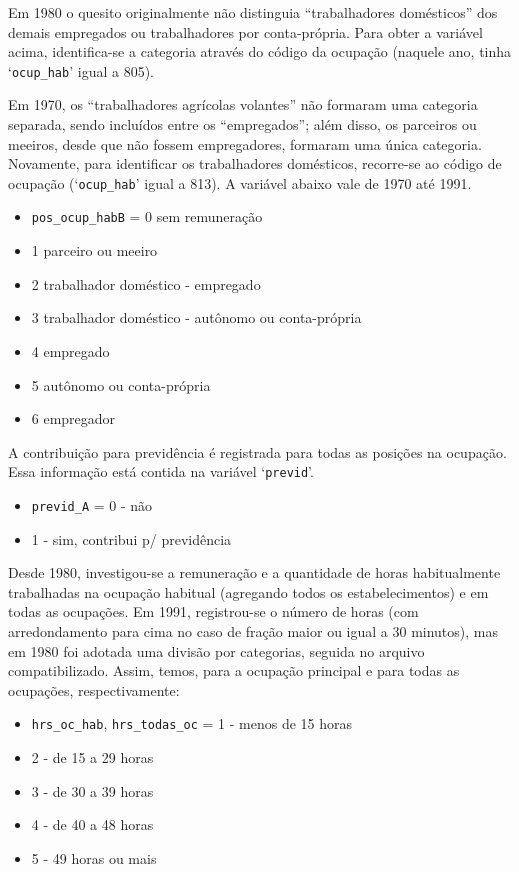 \documentclass[12pt,a4paper]{article}
\newcommand{\vr}[1]{\texttt{#1}}
\begin{document}
Em 1980 o quesito originalmente não distinguia “trabalhadores domésticos” dos demais empregados ou trabalhadores por conta-própria. Para obter a variável acima, identifica-se a categoria através do código da ocupação (naquele ano, tinha ‘\vr{ocup\_hab}’ igual a 805).

Em 1970, os “trabalhadores agrícolas volantes” não formaram uma categoria separada, sendo incluídos entre os “empregados”; além disso, os parceiros ou meeiros, desde que não fossem empregadores, formaram uma única categoria. Novamente, para identificar os trabalhadores domésticos, recorre-se ao código de ocupação (‘\vr{ocup\_hab}’ igual a 813). A variável abaixo vale de 1970 até 1991.
\begin{itemize}
  \item \vr{pos\_ocup\_habB} = 0 sem remuneração
  \item 1 parceiro ou meeiro
  \item 2 trabalhador doméstico - empregado
  \item 3 trabalhador doméstico - autônomo ou conta-própria
  \item 4 empregado
  \item 5 autônomo ou conta-própria
  \item 6 empregador
\end{itemize}

A contribuição para previdência é registrada para todas as posições na ocupação. Essa informação está contida na variável ‘\vr{previd}’.
\begin{itemize}
  \item \vr{previd\_A} = 0 - não
  \item 1 - sim, contribui p/ previdência
\end{itemize}

Desde 1980, investigou-se a remuneração e a quantidade de horas habitualmente trabalhadas na ocupação habitual (agregando todos os estabelecimentos) e em todas as ocupações. Em 1991, registrou-se o número de horas (com arredondamento para cima no caso de fração maior ou igual a 30 minutos), mas em 1980 foi adotada uma divisão por categorias, seguida no arquivo compatibilizado. Assim, temos, para a ocupação principal e para todas as ocupações, respectivamente:
\begin{itemize}
  \item \vr{hrs\_oc\_hab}, \vr{hrs\_todas\_oc} = 1 - menos de 15 horas
  \item 2 - de 15 a 29 horas
  \item 3 - de 30 a 39 horas
  \item 4 - de 40 a 48 horas
  \item 5 - 49 horas ou mais
\end{itemize}
\end{document}
